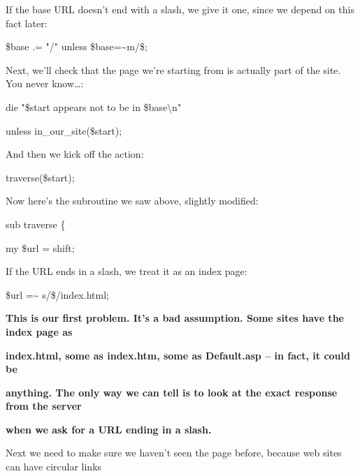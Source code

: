 \documentclass[a4paper,11pt]{book}
\begin{document}
\noindent 

\noindent If the base URL doesn't end with a slash, we give it one, since we depend on this fact later:

\noindent 

\noindent \$base .= "/" unless \$base=\~{}m\textbar /\$\textbar ;

\noindent 

\noindent Next, we'll check that the page we're starting from is actually part of the site. You never know\dots :

\noindent 

\noindent die "\$start appears not to be in \$base\textbackslash n"

\noindent unless in\_our\_site(\$start);

\noindent 

\noindent And then we kick off the action:

\noindent 

\noindent traverse(\$start);

\noindent 

\noindent Now here's the subroutine we saw above, slightly modified:

\noindent 

\noindent sub traverse \{

\noindent my \$url = shift;

\noindent 

\noindent If the URL ends in a slash, we treat it as an index page:

\noindent 

\noindent \$url =\~{} s\textbar /\$\textbar /index.html\textbar ;

\noindent 

\noindent 

\noindent 

\noindent \textbf{This is our first problem. It's a bad assumption. Some sites have the index page as}

\noindent \textbf{index.html, some as index.htm, some as Default.asp -- in fact, it could be}

\noindent \textbf{anything. The only way we can tell is to look at the exact response from the server}

\noindent \textbf{when we ask for a URL ending in a slash.}

\noindent 

\noindent 

\noindent Next we need to make sure we haven't seen the page before, because web sites can have circular links
\end{document}
